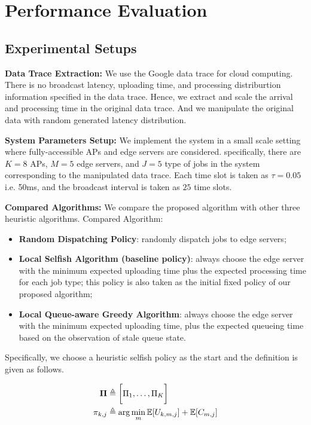 \section{Performance Evaluation}
\label{sec:evaluation}


\subsection{Experimental Setups}

\textbf{Data Trace Extraction:}
We use the Google data trace for cloud computing.
There is no broadcast latency, uploading time, and processing distriburtion information specified in the data trace.
Hence, we extract and scale the arrival and processing time in the original data trace.
And we manipulate the original data with random generated latency distribution.

\textbf{System Parameters Setup:}
We implement the system in a small scale setting where fully-accessible APs and edge servers are considered.
specifically, there are $K=8$ APs, $M=5$ edge servers, and $J=5$ type of jobs in the system corresponding to the manipulated data trace.
Each time slot is taken as $\tau = 0.05$ i.e. 50ms, and the broadcast interval is taken as $25$ time slots.

\textbf{Compared Algorithms:}
We compare the proposed algorithm with other three heuristic algorithms.
Compared Algorithm:
\begin{itemize}
    \item \textbf{Random Dispatching Policy}:
            randomly dispatch jobs to edge servers;
    \item \textbf{Local Selfish Algorithm (baseline policy)}:
            always choose the edge server with the minimum expected uploading time plus the expected processing time for each job type; this policy is also taken as the initial fixed policy of our proposed algorithm;
    \item \textbf{Local Queue-aware Greedy Algorithm}:
            always choose the edge server with the minimum expected uploading time, plus the expected queueing time based on the observation of stale queue state.
\end{itemize}
Specifically, we choose a heuristic selfish policy as the start and the definition is given as follows.
\begin{definition}
    \begin{align}
        \boldsymbol{\Pi} &\triangleq \bigg[ \Pi_{1}, \dots, \Pi_{K} \bigg]
        \\
        \pi_{k,j} &\triangleq \arg\min_{m} \mathbb{E}[U_{k,m,j}] + \mathbb{E}[C_{m,j}]
    \end{align}
\end{definition}

